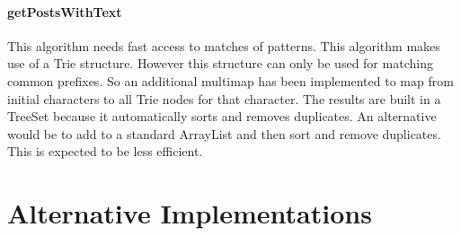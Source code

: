 \documentclass[11pt, oneside]{article}   	%
\begin{document}
\paragraph{getPostsWithText}

This algorithm needs fast access to matches of patterns. This algorithm makes use of a Trie structure. However this structure can only be used for matching common prefixes.  So an additional multimap has been implemented to map from initial characters to all Trie nodes for that character. The results are built in a TreeSet because it automatically sorts and removes duplicates. An alternative would be to add to a standard ArrayList and then sort and remove duplicates. This is expected to be less efficient.

\section{Alternative Implementations}
\end{document}
